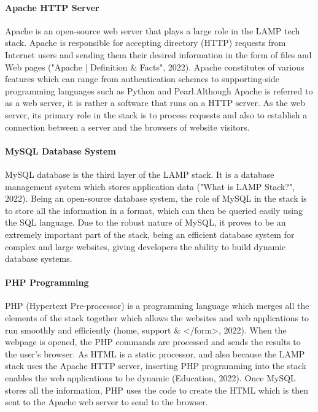 \documentclass[a4paper, 11pt]{report}
\begin{document}
	\paragraph {Apache HTTP Server} Apache is an open-source web server that plays a large role in the LAMP tech stack. Apache is responsible for accepting directory (HTTP) requests from Internet users and sending them their desired information in the form of files and Web pages ("Apache | Definition & Facts", 2022). Apache constitutes of various features which can range from authentication schemes to supporting-side programming languages such as Python and Pearl.Although Apache is referred to as a web server, it is rather a software that runs on a HTTP server. As the web server, its primary role in the stack is to process requests and also to establish a connection between a server and the browsers of website visitors.

	\paragraph {MySQL Database System} MySQL database is the third layer of the LAMP stack. It is a database management system which stores application data ("What is LAMP Stack?", 2022). Being an open-source database system, the role of MySQL in the stack is to store all the information in a format, which can then be queried easily using the SQL language. Due to the robust nature of MySQL, it proves to be an extremely important part of the stack, being an efficient database system for complex and large websites, giving developers the ability to build dynamic database systems.

    \paragraph {PHP Programming} PHP (Hypertext Pre-processor) is a programming language which merges all the elements of the stack together which allows the websites and web applications to run smoothly and efficiently (home, support & </form>, 2022). When the webpage is opened, the PHP commands are processed and sends the results to the user’s browser. As HTML is a static processor, and also because the LAMP stack uses the Apache HTTP server, inserting PHP programming into the stack enables the web applications to be dynamic (Education, 2022). Once MySQL stores all the information, PHP uses the code to create the HTML which is then sent to the Apache web server to send to the browser.
\end{document}

